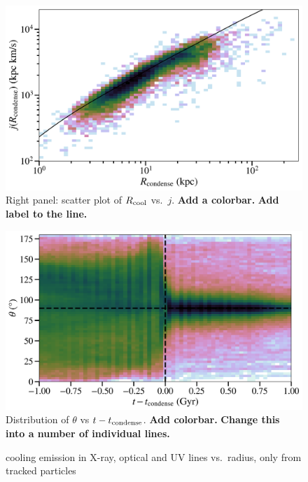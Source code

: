 \documentclass[fleqn,usenatbib]{mnras}
\newcommand{\Rcool}{R_{\rm cool}} %
\begin{document}
\begin{figure}
    \centering
    \includegraphics[width=\columnwidth]{figures/j_vs_rcondense.png}
    \caption{
    Right panel: scatter plot of $\Rcool$ vs.~$j$.
    \textbf{Add a colorbar.}
    \textbf{Add label to the line.}
    }
    \label{f:Rcool}
\end{figure}


\begin{figure}
    \centering
    \includegraphics[width=\columnwidth]{figures/theta_vs_t.png}
    \caption{
    Distribution of $\theta$ vs $t - t_{\rm condense}$.
    \textbf{Add colorbar.}
    \textbf{Change this into a number of individual lines.}
    }
    \label{f: theta vs R}
\end{figure}



\begin{figure}
    \centering
    \caption{cooling emission in X-ray, optical and UV lines vs.\ radius, only from tracked particles}
    \label{f:emission}
\end{figure}
\end{document}
